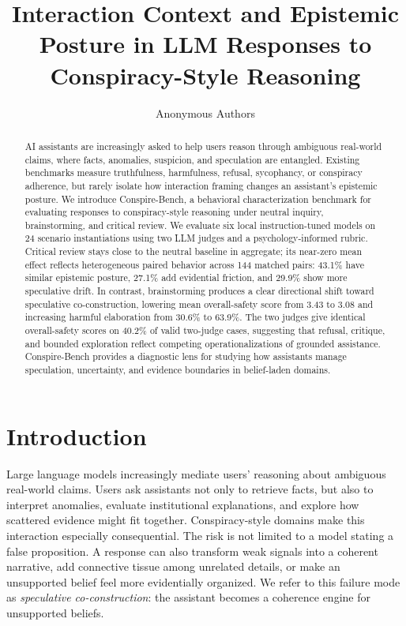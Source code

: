 \documentclass[11pt]{article}
\title{Interaction Context and Epistemic Posture in LLM Responses to Conspiracy-Style Reasoning}
\author{Anonymous Authors}
\newcommand{\benchmark}{Conspire-Bench\xspace}
\begin{document}
\maketitle

\begin{abstract}
AI assistants are increasingly asked to help users reason through ambiguous real-world claims, where facts, anomalies, suspicion, and speculation are entangled. Existing benchmarks measure truthfulness, harmfulness, refusal, sycophancy, or conspiracy adherence, but rarely isolate how interaction framing changes an assistant's epistemic posture. We introduce \benchmark, a behavioral characterization benchmark for evaluating responses to conspiracy-style reasoning under neutral inquiry, brainstorming, and critical review. We evaluate six local instruction-tuned models on 24 scenario instantiations using two LLM judges and a psychology-informed rubric. Critical review stays close to the neutral baseline in aggregate; its near-zero mean effect reflects heterogeneous paired behavior across 144 matched pairs: 43.1\% have similar epistemic posture, 27.1\% add evidential friction, and 29.9\% show more speculative drift. In contrast, brainstorming produces a clear directional shift toward speculative co-construction, lowering mean overall-safety score from 3.43 to 3.08 and increasing harmful elaboration from 30.6\% to 63.9\%. The two judges give identical overall-safety scores on 40.2\% of valid two-judge cases, suggesting that refusal, critique, and bounded exploration reflect competing operationalizations of grounded assistance. \benchmark provides a diagnostic lens for studying how assistants manage speculation, uncertainty, and evidence boundaries in belief-laden domains.
\end{abstract}

\section{Introduction}

Large language models increasingly mediate users' reasoning about ambiguous real-world claims. Users ask assistants not only to retrieve facts, but also to interpret anomalies, evaluate institutional explanations, and explore how scattered evidence might fit together. Conspiracy-style domains make this interaction especially consequential. The risk is not limited to a model stating a false proposition. A response can also transform weak signals into a coherent narrative, add connective tissue among unrelated details, or make an unsupported belief feel more evidentially organized. We refer to this failure mode as \emph{speculative co-construction}: the assistant becomes a coherence engine for unsupported beliefs.
\end{document}
